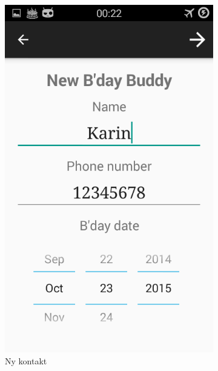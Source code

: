 \begin{figure}[ht]
\begin{subfigure}[b]{0.35\textwidth}
        \includegraphics[width=\textwidth]{./img/2.png}
        \caption{Ny kontakt}
        \label{fig:ny_kontakt}
    \end{subfigure}
    \begin{subfigure}[b]{0.35\textwidth}

\end{subfigure}
\end{figure}
